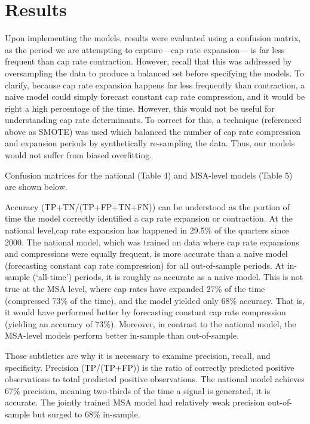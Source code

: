 \documentclass[jrfm,article,accept,oneauthor,pdftex]{Definitions/mdpi}
\begin{document}
\section{Results}

Upon implementing the models, results were evaluated using a confusion matrix, as the period we are attempting to capture---cap rate expansion--- is far less frequent than cap rate contraction. However, recall that  this was addressed by oversampling the data to produce a balanced set before specifying the models. To clarify, because cap rate expansion happens far less frequently than contraction, a naive model could simply forecast constant cap rate compression, and it would be right a high percentage of the time. However, this would not be useful for understanding cap rate determinants. To correct for this, a technique (referenced above as SMOTE) was used which balanced the number of cap rate compression and expansion periods by synthetically re-sampling the data. Thus, our models would not suffer from biased overfitting.  

Confusion matrices for the national (Table 4) and MSA-level models (Table 5) are shown below. 

Accuracy (TP+TN/(TP+FP+TN+FN)) can be understood as the portion of time the model correctly identified a cap rate expansion or contraction. At the national level,cap rate expansion has happened in 29.5\% of the quarters since 2000. The national model, which was trained on data where cap rate expansions and compressions were equally frequent, is more accurate than a naive model (forecasting constant cap rate compression) for all out-of-sample periods. At in-sample (`all-time') periods, it is roughly as accurate as a naive model. This is not true at the MSA level, where cap rates have expanded 27\% of the time (compressed 73\% of the time), and the model yielded only 68\% accuracy. That is, it would have performed better by forecasting constant cap rate compression (yielding an accuracy of 73\%). Moreover, in contrast to the national  model, the MSA-level models perform better in-sample than out-of-sample.

Those subtleties are why it is necessary to examine precision, recall, and specificity. Precision (TP/(TP+FP)) is the ratio of correctly predicted positive observations to total predicted positive observations. The national model achieves 67\% precision, meaning two-thirds of the time a signal is generated, it is accurate. The jointly trained MSA model had relatively weak precision out-of-sample but surged to 68\% in-sample. 
\end{document}
